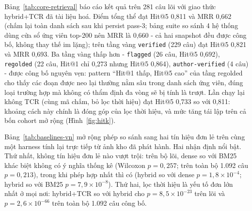\documentclass[11pt,a4paper]{article}
\begin{document}
Bảng~\ref{tab:core-retrieval} báo cáo kết quả trên 281 câu lõi với giao thức hybrid+TCR đã tài liệu hoá. Điểm tổng thể đạt Hit@5 0,811 và MRR 0,662 (chấm lại toàn danh sách sau khi persist pass-3; bảng suite so sánh 4 hệ thống dùng cửa sổ ứng viên top-200 nên MRR là 0,660 - cả hai snapshot đều được công bố, không thay thế im lặng); trên tầng vàng \texttt{verified} (229 câu) đạt Hit@5 0,821 và MRR 0,693. Ba tầng vàng thấp hơn - \texttt{flagged} (26 câu, Hit@5 0,692), \texttt{regolded} (22 câu, Hit@1 chỉ 0,273 nhưng Hit@5 0,864), \texttt{author-verified} (4 câu) - được công bố nguyên vẹn: pattern ``Hit@1 thấp, Hit@5 cao'' của tầng regolded cho thấy các đoạn được neo lại thường nằm sâu trong danh sách ứng viên, đúng loại trường hợp mà không có thẩm định đa vòng sẽ bị tính là trượt. Lần chạy lại không TCR (cùng mã chấm, bỏ lọc thời hiệu) đạt Hit@5 0,733 so với 0,811: khoảng cách này chính là đóng góp của lọc thời hiệu, và mức tăng tái lập trên cả bốn cohort mở rộng (Hình~\ref{fig:hitk}).

Bảng~\ref{tab:baselines-vn} mở rộng phép so sánh sang hai tín hiệu đơn lẻ trên cùng một harness tính lại trực tiếp từ ảnh kho đã phát hành. Hai nhận định nổi bật. Thứ nhất, không tín hiệu đơn lẻ nào vượt trội: trên bộ lõi, dense so với BM25 khác biệt không có ý nghĩa thống kê (Wilcoxon $p=0{,}257$; trên toàn bộ 1.092 câu $p=0{,}213$), trong khi phép hợp nhất thì có (hybrid so với dense $p=1{,}8\times10^{-4}$; hybrid so với BM25 $p=7{,}9\times10^{-8}$). Thứ hai, lọc thời hiệu là yếu tố đơn lớn nhất ở mọi nơi: hybrid+TCR so với hybrid cho $p=8{,}5\times10^{-23}$ trên lõi và $p=2{,}6\times10^{-66}$ trên toàn bộ 1.092 câu công bố.
\end{document}
